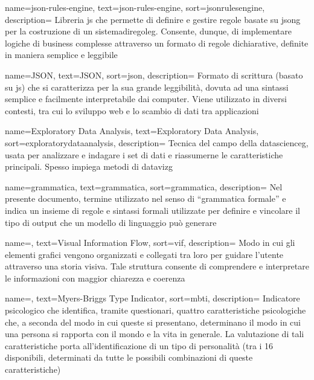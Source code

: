  {
    name=json-rules-engine,
    text=json-rules-engine,
    sort=jsonrulesengine,
    description=
    {Libreria \gls{js} che permette di definire e gestire regole basate su \gls{jsong} per la costruzione di un \gls{sistemadiregoleg}.
    Consente, dunque, di implementare logiche di business complesse attraverso un formato di regole dichiarative, definite in maniera semplice e leggibile}
}

 {
    name=JSON,
    text=JSON,
    sort=json,
    description=
    {Formato di scrittura (basato su \gls{js}) che si caratterizza per la sua grande leggibilità, dovuta ad una sintassi semplice e facilmente interpretabile dai computer. 
    Viene utilizzato in diversi contesti, tra cui lo sviluppo web e lo scambio di dati tra applicazioni}
}

 {
    name=Exploratory Data Analysis,
    text=Exploratory Data Analysis,
    sort=exploratorydataanalysis,
    description=
    {Tecnica del campo della \gls{datascienceg}, usata per analizzare e indagare i set di dati e riassumerne le caratteristiche principali.
    Spesso impiega metodi di \gls{datavizg}}
}

 {
    name=grammatica,
    text=grammatica,
    sort=grammatica,
    description=
    {Nel presente documento, termine utilizzato nel senso di ``grammatica formale'' e indica un insieme di regole e sintassi formali utilizzate per 
    definire e vincolare il tipo di output che un modello di linguaggio può generare}
}

 {
    name=,
    text=Visual Information Flow,
    sort=vif,
    description=
    {Modo in cui gli elementi grafici vengono organizzati e collegati tra loro per guidare l'utente attraverso una storia visiva. 
    Tale struttura consente di comprendere e interpretare le informazioni con maggior chiarezza e coerenza}
}


 {
    name=,
    text=Myers-Briggs Type Indicator,
    sort=mbti,
    description=
    {Indicatore psicologico che identifica, tramite questionari, quattro caratteristiche psicologiche che, a seconda del modo in cui queste si presentano, 
    determinano il modo in cui una persona si rapporta con il mondo e la vita in generale.
    La valutazione di tali caratteristiche porta all'identificazione di un tipo di personalità (tra i 16 disponibili, determinati da tutte 
    le possibili combinazioni di queste caratteristiche)}
}

